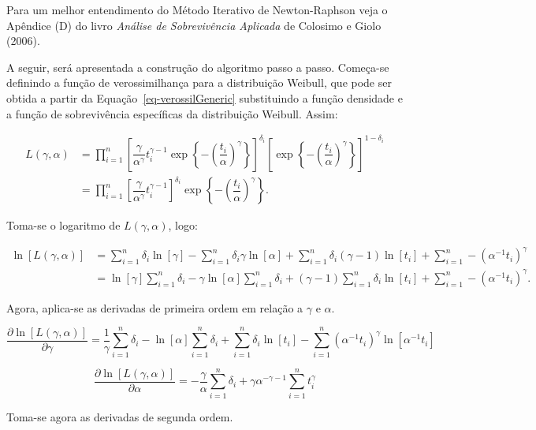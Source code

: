 \documentclass[
  12pt,
  letterpaper,
  DIV=11,
  numbers=noendperiod]{scrreprt}
\begin{document}
Para um melhor entendimento do Método Iterativo de Newton-Raphson veja o
Apêndice (D) do livro \emph{Análise de Sobrevivência Aplicada} de
Colosimo e Giolo (2006).

A seguir, será apresentada a construção do algoritmo passo a passo.
Começa-se definindo a função de verossimilhança para a distribuição
Weibull, que pode ser obtida a partir da
Equação~\ref{eq-verossilGeneric} substituindo a função densidade e a
função de sobrevivência específicas da distribuição Weibull. Assim:

\begin{align*}
    L (\gamma, \alpha) & = \prod_{i = 1}^{n} \left[ \dfrac{\gamma}{\alpha^{\gamma}} t_{i}^{\gamma - 1} \exp \left\{ - \left(\dfrac{t_{i}}{\alpha}\right)^{\gamma} \right\} \right]^{\delta_{i}} \left[ \exp \left\{ - \left(\dfrac{t_{i}}{\alpha}\right)^{\gamma} \right\} \right]^{1 - \delta_{i}} \\
    & = \prod_{i = 1}^{n} \left[ \dfrac{\gamma}{\alpha^{\gamma}} t_{i}^{\gamma - 1} \right]^{\delta_{i}}  \exp \left\{ - \left(\dfrac{t_{i}}{\alpha}\right)^{\gamma} \right\}.
\end{align*}

Toma-se o logaritmo de \(L(\gamma, \alpha)\), logo:

\begin{align*}
    \ln[L(\gamma, \alpha)] & = \sum_{i = 1}^{n} \delta_{i} \ln[\gamma] - \sum_{i = 1}^{n} \delta_{i} \gamma \ln[\alpha] + \sum_{i = 1}^{n} \delta_{i} (\gamma - 1) \ln[t_{i}] + \sum_{i = 1}^{n} - (\alpha^{-1} t_{i})^{\gamma} \\
    & = \ln[\gamma] \sum_{i = 1}^{n} \delta_{i} - \gamma \ln[\alpha] \sum_{i = 1}^{n} \delta_{i} + (\gamma - 1) \sum_{i = 1}^{n} \delta_{i} \ln[t_{i}] + \sum_{i = 1}^{n} - (\alpha^{-1} t_{i})^{\gamma}.
\end{align*}

Agora, aplica-se as derivadas de primeira ordem em relação a \(\gamma\)
e \(\alpha\).

\[
\dfrac{\partial \ln[L(\gamma, \alpha)]}{\partial \gamma} = \dfrac{1}{\gamma} \sum_{i = 1}^{n} \delta_{i} - \ln[\alpha] \sum_{i = 1}^{n} \delta_{i} + \sum_{i = 1}^{n} \delta_{i} \ln[t_{i}] - \sum_{i = 1}^{n} (\alpha^{-1} t_{i})^{\gamma} \ln[\alpha^{-1} t_{i}]
\]

\[
\dfrac{\partial \ln[L (\gamma, \alpha)]}{\partial \alpha} = - \dfrac{\gamma}{\alpha} \sum_{i = 1}^{n} \delta_{i} + \gamma \alpha^{-\gamma - 1} \sum_{i = 1}^{n} t_{i}^{\gamma}
\]

Toma-se agora as derivadas de segunda ordem.
\end{document}
